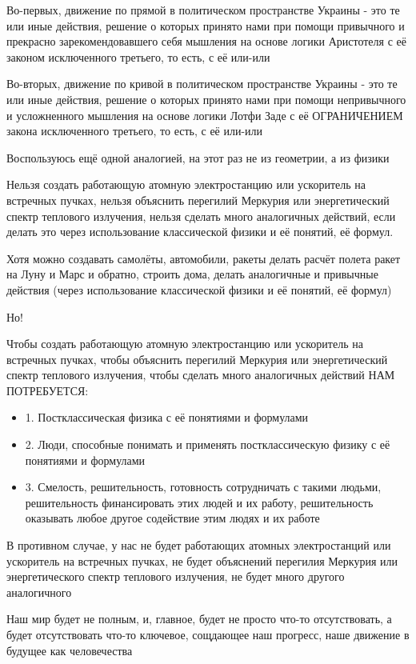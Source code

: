 Во-первых, движение по прямой в политическом пространстве Украины - это те или
иные действия, решение о которых принято нами при помощи привычного и прекрасно
зарекомендовавшего себя мышления на основе логики Аристотеля с её законом
исключенного третьего, то есть, с её или-или

Во-вторых, движение по кривой в политическом пространстве Украины - это те или
иные действия, решение о которых принято нами при помощи непривычного и
усложненного мышления на основе логики Лотфи Заде с её ОГРАНИЧЕНИЕМ закона
исключенного третьего, то есть, с её или-или

Воспользуюсь ещё одной аналогией, на этот раз не из геометрии, а из физики 

Нельзя создать работающую атомную электростанцию или ускоритель на встречных
пучках, нельзя объяснить перегилий Меркурия или энергетический спектр теплового
излучения, нельзя сделать много аналогичных действий, если делать это через
использование классической физики и её понятий, её формул.

Хотя можно создавать самолёты, автомобили, ракеты делать расчёт полета ракет на
Луну и Марс и обратно, строить дома, делать аналогичные и привычные действия
(через использование классической физики и её понятий, её формул)

Но!

Чтобы создать работающую атомную электростанцию или ускоритель на встречных
пучках, чтобы объяснить перегилий Меркурия или энергетический спектр теплового
излучения, чтобы  сделать много аналогичных действий НАМ ПОТРЕБУЕТСЯ:

\begin{itemize}
  \item 1. Постклассическая физика с её понятиями и формулами
  \item 2. Люди, способные  понимать и применять постклассическую физику с её понятиями и формулами
  \item 3. Смелость, решительность, готовность сотрудничать с такими людьми, решительность финансировать этих людей и их работу, решительность оказывать любое другое содействие этим людях и их работе
\end{itemize}

В противном случае, у нас не будет работающих атомных электростанций или
ускоритель на встречных пучках, не будет объяснений перегилия Меркурия или
энергетического спектр теплового излучения, не будет много другого аналогичного

Наш мир будет не полным, и, главное, будет не просто что-то отсутствовать, а
будет отсутствовать что-то ключевое, сощдающее наш прогресс, наше движение в
будущее как человечества

